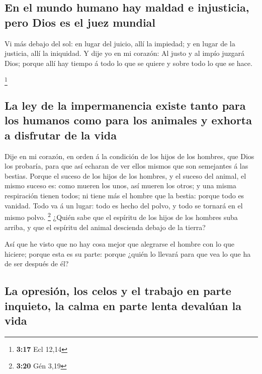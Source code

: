 \hypertarget{en-el-mundo-humano-hay-maldad-e-injusticia-pero-dios-es-el-juez-mundial}{%
\subsection{En el mundo humano hay maldad e injusticia, pero Dios es el
juez
mundial}\label{en-el-mundo-humano-hay-maldad-e-injusticia-pero-dios-es-el-juez-mundial}}

 Vi más debajo del sol: en lugar del juicio, allí la
impiedad; y en lugar de la justicia, allí la iniquidad. 
Y dije yo en mi corazón: Al justo y al impío juzgará Dios; porque allí
hay tiempo á todo lo que se quiere y sobre todo lo que se hace.

\footnote{\textbf{3:17} Ecl 12,14}

\hypertarget{la-ley-de-la-impermanencia-existe-tanto-para-los-humanos-como-para-los-animales-y-exhorta-a-disfrutar-de-la-vida}{%
\subsection{La ley de la impermanencia existe tanto para los humanos
como para los animales y exhorta a disfrutar de la
vida}\label{la-ley-de-la-impermanencia-existe-tanto-para-los-humanos-como-para-los-animales-y-exhorta-a-disfrutar-de-la-vida}}

 Dije en mi corazón, en orden á la condición de los hijos
de los hombres, que Dios los probaría, para que así echaran de ver ellos
mismos que son semejantes á las bestias.  Porque el
suceso de los hijos de los hombres, y el suceso del animal, el mismo
suceso es: como mueren los unos, así mueren los otros; y una misma
respiración tienen todos; ni tiene más el hombre que la bestia: porque
todo es vanidad.  Todo va á un lugar: todo es hecho del
polvo, y todo se tornará en el mismo polvo. \footnote{\textbf{3:20} Gén
  3,19}  ¿Quién sabe que el espíritu de los hijos de los
hombres suba arriba, y que el espíritu del animal descienda debajo de la
tierra?

 Así que he visto que no hay cosa mejor que alegrarse el
hombre con lo que hiciere; porque esta es su parte: porque ¿quién lo
llevará para que vea lo que ha de ser después de él?

\hypertarget{la-opresiuxf3n-los-celos-y-el-trabajo-en-parte-inquieto-la-calma-en-parte-lenta-devaluxfaan-la-vida}{%
\subsection{La opresión, los celos y el trabajo en parte inquieto, la
calma en parte lenta devalúan la
vida}\label{la-opresiuxf3n-los-celos-y-el-trabajo-en-parte-inquieto-la-calma-en-parte-lenta-devaluxfaan-la-vida}}

